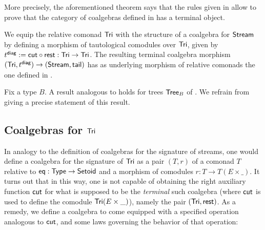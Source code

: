 \documentclass[envcountsame]{llncs}
\begin{document}
More precisely, the aforementioned theorem says that the rules given in  allow to prove that
the category of coalgebras defined in  has a terminal object.

\begin{example}
  We equip the relative comonad $\mathsf{Tri}$ with the structure of a coalgebra for $\mathsf{Stream}$ by defining a 
  morphism of tautological comodules over $\mathsf{Tri}$, given by
   $ t^{\mathsf{diag}} := {\mathsf{cut}} \circ {\ensuremath{\mathsf{rest}}}  : \mathsf{Tri} \to \mathsf{Tri}$.
  The resulting terminal coalgebra morphism
   $(\mathsf{Tri}, t^{\mathsf{diag}}) \to (\mathsf{Stream}, \mathsf{tail})$ has as underlying morphism of relative comonads the one defined in .
\end{example}

\begin{Long}
 
\begin{remark}
 Fix a type $B$. A result analogous to  holds for trees $\mathsf{Tree}_B$ of . 
 We refrain from giving a precise statement of this result.
\end{remark}

\end{Long}

\begin{Long}
\subsection{Coalgebras for $\mathsf{Tri}$}
\end{Long}

In analogy to the definition of coalgebras for the signature of streams, one would define
a coalgebra for the signature of $\mathsf{Tri}$ as a pair $(T,r)$ of a comonad $T$ relative to $\mathsf{eq} : \mathsf{Type} \to \mathsf{Setoid}$ and 
a morphism of comodules $r : T \to T(E\times \_)$. 
It turns out that in this way, one is not capable of obtaining the right auxiliary function $\mathsf{cut}$ for what is
supposed to be the \emph{terminal} such coalgebra (where $\mathsf{cut}$ is used to define the comodule $\mathsf{Tri}(E\times \_)$), namely the pair $(\mathsf{Tri},\mathsf{rest})$.
As a remedy, we define a coalgebra to come equipped with a specified operation analogous to $\mathsf{cut}$, and some laws governing
the behavior of that operation:
\end{document}
